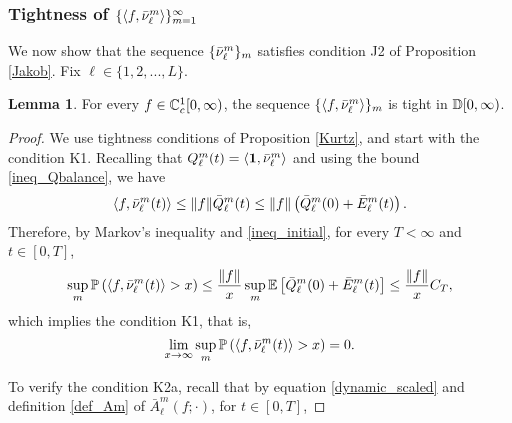 \documentclass{article}
\theoremstyle{definition}
\newtheorem{lemma}[theorem]{Lemma}
\numberwithin{equation}{section}
\begin{document}
\subsubsection{Tightness of $\{\langle f,\bar{\nu}^m_\ell\rangle\}_{m=1}^\infty$}

We now show that the sequence $\{\bar{\nu}^m_\ell\}_m$ satisfies condition J2 of Proposition \ref{Jakob}. Fix $\ell\in\{1,2,...,L\}$.


\begin{lemma}\label{lem_nuK2}
For every $f\in\mathbb{C}^1_c[0,\infty)$, the sequence $\{\langle f,\bar{\nu}^m_\ell\rangle \}_m$ is tight in $\mathbb{D}[0,\infty)$.
\end{lemma}

\begin{proof}
We use tightness conditions of Proposition \ref{Kurtz}, and start with the condition K1. Recalling that $\ql^m_\ell(t)= \langle \f1,\bnu^m_\ell\rangle$ and using the bound \eqref{ineq_Qbalance}, we have
\[
\langle f,\bar{\nu}^m_\ell(t)\rangle \leq \|f\|\bar {Q}^m_\ell(t) \leq \|f\|\left(  \bar {Q}^m_\ell(0)+ \bar E_\ell^m(t)\right).
\]
Therefore, by Markov's inequality and \eqref{ineq_initial}, for every $T<\infty$ and $t\in[0,T]$,
\[
\sup_{m}\mathbb{P}\left(\langle f,\bar{\nu}^m_\ell(t)\rangle>x\right) \leq \frac{\|f\|}{x} \sup_{m}\mathbb{E}\left[\bar {Q}^m_\ell(0)+ \bar E_\ell^m(t)\right] \leq \frac{\|f\|}{x}C_T,
\]
which implies the condition K1, that is,
  \begin{equation}\label{k1}
  \lim_{x\to\infty} \sup_{m}\mathbb{P}\left(\langle f,\bar{\nu}^m_\ell(t)\rangle>x\right)=0.
\end{equation}


To verify the condition K2a, recall that by equation \eqref{dynamic_scaled} and definition \eqref{def_Am} of $\bar A^m_\ell(f;\cdot)$, for $t\in[0,T]$,


\end{proof}
\end{document}
